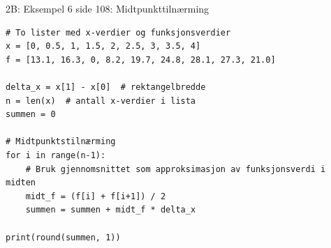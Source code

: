 \greenheader
\begin{frame}[fragile]{2B: Eksempel 6 side 108: Midtpunkttilnærming}
\begin{verbatim}
# To lister med x-verdier og funksjonsverdier
x = [0, 0.5, 1, 1.5, 2, 2.5, 3, 3.5, 4]
f = [13.1, 16.3, 0, 8.2, 19.7, 24.8, 28.1, 27.3, 21.0]

delta_x = x[1] - x[0]  # rektangelbredde
n = len(x)  # antall x-verdier i lista
summen = 0

# Midtpunktstilnærming
for i in range(n-1):
    # Bruk gjennomsnittet som approksimasjon av funksjonsverdi i midten
    midt_f = (f[i] + f[i+1]) / 2
    summen = summen + midt_f * delta_x

print(round(summen, 1))

\end{verbatim}
\end{frame}


